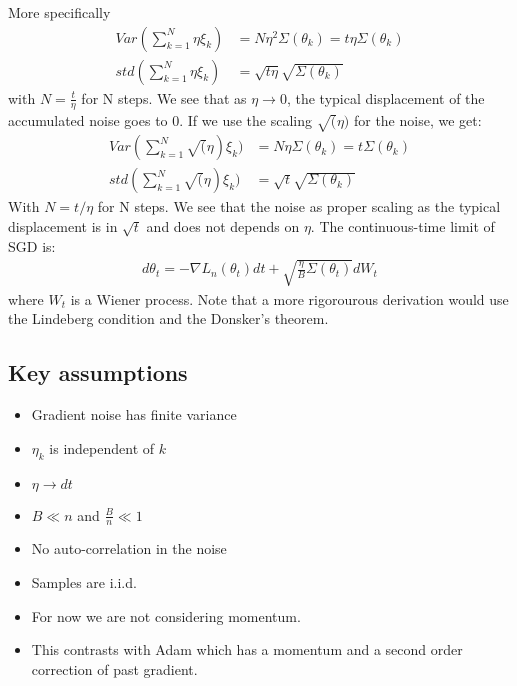 \documentclass[11pt]{article}
\begin{document}
More specifically
\begin{align}
Var(\sum_{k=1}^N \eta \xi_k) & = N\eta^2\Sigma(\theta_k) = t\eta\Sigma(\theta_k)\\
std( \sum_{k=1}^N \eta \xi_k) & = \sqrt{t\eta}\sqrt{\Sigma(\theta_k)}
\end{align}
with $N = \frac{t}{\eta}$ for N steps. We see that as $\eta \to 0$, the typical displacement of the accumulated noise goes to 0.
If we use the scaling $\sqrt(\eta)$ for the noise, we get:
\begin{align}
Var(\sum_{k=1}^N \sqrt(\eta) \xi_k) & = N\eta\Sigma(\theta_k) = t\Sigma(\theta_k)\\
std( \sum_{k=1}^N \sqrt(\eta) \xi_k) & = \sqrt{t}\sqrt{\Sigma(\theta_k)}
\end{align}
With $N= t/\eta$ for N steps. We see that the noise as proper scaling as the typical displacement is in $\sqrt{t}$ and does not depends on $\eta$.
The continuous-time limit of SGD is:
\begin{align}
d\theta_t = - \nabla L_n(\theta_t) dt + \sqrt{\frac{\eta}{B}\Sigma(\theta_t)} dW_t
\end{align}
where $W_t$ is a Wiener process. Note that a more rigorourous derivation would use the Lindeberg condition and the Donsker's theorem.
\subsection{Key assumptions}

\begin{itemize}
    \item Gradient noise has finite variance
    \item $\eta_k$ is independent of $k$
    \item $\eta \to dt$
    \item $B \ll n$ and $\frac{B}{n} \ll 1$
    \item No auto-correlation in the noise
    \item Samples are i.i.d.
    \item For now we are not considering momentum.
    \item This contrasts with Adam which has a momentum and a second order correction of past gradient.
\end{itemize}
\end{document}
